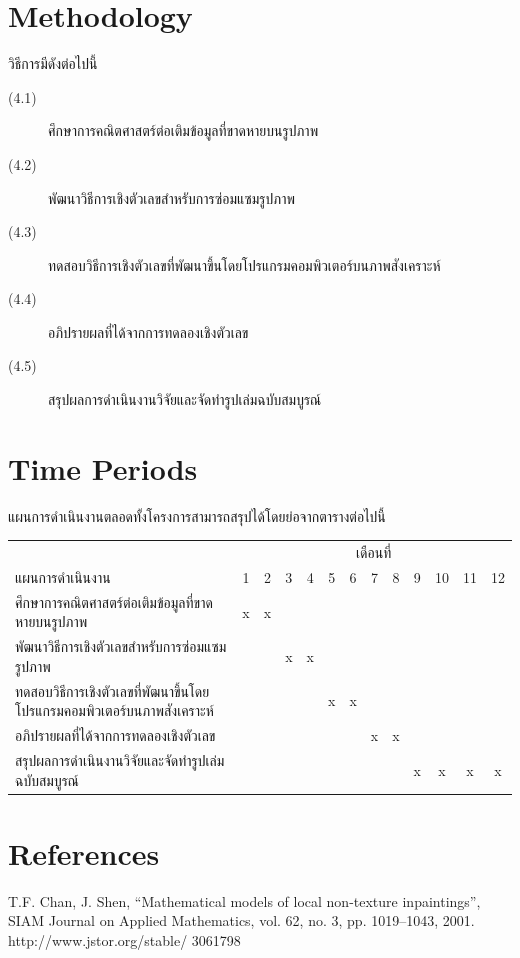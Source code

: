 \documentclass[hidelinks,a4paper,14pt]{article}
\numberwithin{equation}{section}							%
\begin{document}
{\section{Methodology}
วิธีการมีดังต่อไปนี้
\begin{description}
	\item[(4.1)] ศึกษาการคณิตศาสตร์ต่อเติมข้อมูลที่ขาดหายบนรูปภาพ
	\item[(4.2)] พัฒนาวิธีการเชิงตัวเลขสำหรับการซ่อมแซมรูปภาพ
	\item[(4.3)] ทดสอบวิธีการเชิงตัวเลขที่พัฒนาขึ้นโดยโปรแกรมคอมพิวเตอร์บนภาพสังเคราะห์
	\item[(4.4)] อภิปรายผลที่ได้จากการทดลองเชิงตัวเลข
	\item[(4.5)] สรุปผลการดำเนินงานวิจัยและจัดทำรูปเล่มฉบับสมบูรณ์
\end{description}
\section{Time Periods}
แผนการดำเนินงานตลอดทั้งโครงการสามารถสรุปได้โดยย่อจากตารางต่อไปนี้
\begin{center}
	\begin{tabular}[ht]{|l|c|c|c|c|c|c|c|c|c|c|c|c|}
		\hline
		&\multicolumn{12}{c|}{เดือนที่}\\
		\cline{2-13}
		แผนการดำเนินงาน&1&2&3&4&5&6&7&8&9&10&11&12\\
		\hline
		ศึกษาการคณิตศาสตร์ต่อเติมข้อมูลที่ขาดหายบนรูปภาพ&x&x& & & & & & & & & &\\
		พัฒนาวิธีการเชิงตัวเลขสำหรับการซ่อมแซมรูปภาพ& & &x&x& & & & & & & &\\
		ทดสอบวิธีการเชิงตัวเลขที่พัฒนาขึ้นโดยโปรแกรมคอมพิวเตอร์บนภาพสังเคราะห์& & & & &x&x& & & & & &\\
		อภิปรายผลที่ได้จากการทดลองเชิงตัวเลข & & & & & & &x&x& & & &\\
		สรุปผลการดำเนินงานวิจัยและจัดทำรูปเล่มฉบับสมบูรณ์& & & & & & & & &x&x&x&x\\
		\hline
	\end{tabular}
\end{center}




\section{References}

\renewcommand{\section}[2]{} %
\begin{thebibliography}{}
	T.F. Chan, J. Shen, “Mathematical models of local non-texture inpaintings”, SIAM Journal on Applied Mathematics, vol. 62, no. 3, pp. 1019–1043, 2001. http://www.jstor.org/stable/ 3061798
	

\end{thebibliography}}
\end{document}
